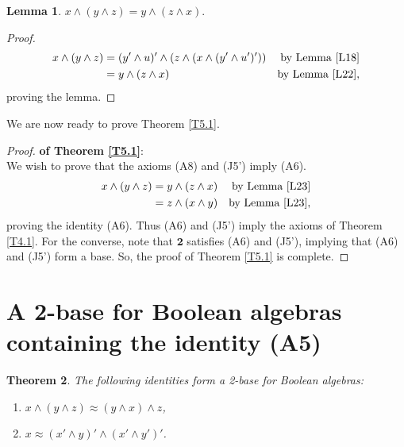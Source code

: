 \documentclass{amsart}
\theoremstyle{plain}
\newtheorem{theorem}{Theorem}[section]
\newtheorem{lemma}[theorem]{Lemma}
\theoremstyle{problem}
\theoremstyle{definition}
\theoremstyle{remark}
\numberwithin{equation}{section}
\begin{document}
\begin{lemma} \label{L23} 
 $x \land (y \land z) = y \land (z \land x).$ 
\end{lemma}

\begin{proof}
\begin{align*}
 x \land (y \land z)  &= (y' \land u)' \land (z \land  (x \land  (y' \land  u')')) &\text{by Lemma   \ref{L18}}\\ 
                                 &= y \land (z \land x) &\text{by Lemma \ref{L22}}, 
\end{align*}
proving the lemma. 
\end{proof}
 
 We are now ready to prove Theorem \ref{T5.1}.
 
\begin{proof} {\bf of Theorem \ref{T5.1}}:\\ 

We wish to prove that the axioms (A8) and (J5') imply (A6). 
\begin{align*}
 x \land (y \land z)  &=  y \land (z \land x) &\text{by Lemma \ref{L23}}\\ 
                              &=  z \land (x \land y) &\text{by Lemma \ref{L23}}, 
\end{align*}
proving the identity (A6).  Thus (A6) and (J5') imply the axioms of        
Theorem \ref{T4.1}.  For the converse, note that $\mathbf{2}$ satisfies (A6) and (J5'),
 implying that (A6) and (J5') form a base.
So, the proof of Theorem \ref{T5.1} is complete.  
\end{proof}




\medskip
\section{A 2-base for Boolean algebras containing the identity (A5)}

\begin{theorem} \label{T6.1}
    The following identities form a 2-base for Boolean algebras:
\begin{enumerate}
   \item[{\rm(A5)}] ${x \land ( y \land z )\approx (y \land x) \land z}$, %
   \item[{\rm(J5')}] ${x \approx (x' \land y)' \land (x' \land y')'}$.
\end{enumerate}
\end{theorem}
 
\end{document}
